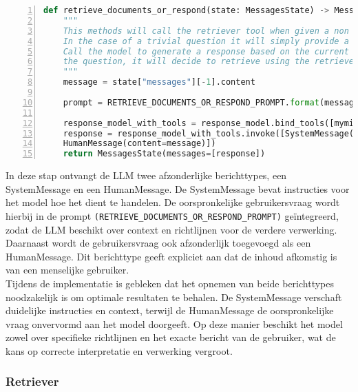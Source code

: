 \begin{lstlisting}[basicstyle=\small, frame=single, breaklines=true, postbreak=\mbox{\textcolor{red}{$\hookrightarrow$}\space}, escapeinside ={\%,}, escapechar={!}, numbers=left, language=Python, caption=Functie die beslist tussen direct antwoord en documentopvraging]
def retrieve_documents_or_respond(state: MessagesState) -> MessagesState:
    """
    This methods will call the retriever tool when given a non trivial question is asked.
    In the case of a trivial question it will simply provide a response
    Call the model to generate a response based on the current state. Given
    the question, it will decide to retrieve using the retriever tool, or simply respond to the user.
    """
    message = state["messages"][-1].content
    
    prompt = RETRIEVE_DOCUMENTS_OR_RESPOND_PROMPT.format(message=message)
    
    response_model_with_tools = response_model.bind_tools([myminfin_retriever_tool])
    response = response_model_with_tools.invoke([SystemMessage(content=prompt),
    HumanMessage(content=message)])
    return MessagesState(messages=[response])
\end{lstlisting}

In deze stap ontvangt de LLM twee afzonderlijke berichttypes, een SystemMessage en een HumanMessage. De SystemMessage bevat instructies voor het model hoe het dient te handelen. De oorspronkelijke gebruikersvraag wordt hierbij in de prompt \verb|(RETRIEVE_DOCUMENTS_OR_RESPOND_PROMPT)| geïntegreerd, zodat de LLM beschikt over context en richtlijnen voor de verdere verwerking.
\\[1em]
Daarnaast wordt de gebruikersvraag ook afzonderlijk toegevoegd als een HumanMessage. Dit berichttype geeft expliciet aan dat de inhoud afkomstig is van een menselijke gebruiker.
\\[1em]
Tijdens de implementatie is gebleken dat het opnemen van beide berichttypes noodzakelijk is om optimale resultaten te behalen. De SystemMessage verschaft duidelijke instructies en context, terwijl de HumanMessage de oorspronkelijke vraag onvervormd aan het model doorgeeft. Op deze manier beschikt het model zowel over specifieke richtlijnen en het exacte bericht van de gebruiker, wat de kans op correcte interpretatie en verwerking vergroot.

\subsubsection{Retriever}

